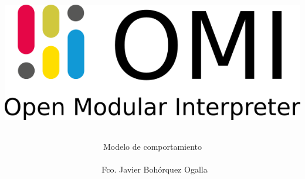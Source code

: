 \documentclass[12pt, spanish]{article}
\author{Modelo de comportamiento \\\\\ Fco. Javier Bohórquez Ogalla}						%
\date{}														%
\title{ 
\begin{center}
\includegraphics[scale=0.5]{logo-doc.png}
\end{center} 
}
\begin{document}
\maketitle
\pagebreak
\tableofcontents
\pagebreak

\end{document}
